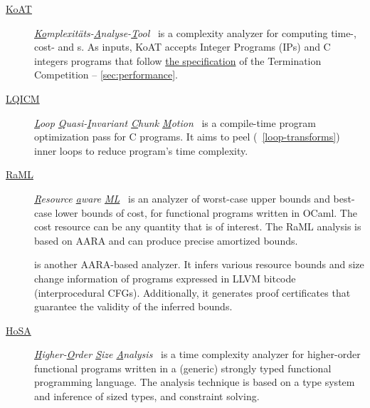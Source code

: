 \begin{description}
\item[\href{https://koat.verify.rwth-aachen.de/cfr_mprf}{KoAT}]
       \emph{\underline{Ko}mplexitäts-\underline{A}nalyse-\underline{T}ool}~\cite{brockschmidt2016}
       is a complexity analyzer for computing time-, cost- and s.
       As inputs, KoAT accepts Integer Programs (IPs) and C integers programs that follow
       \href{https://termination-portal.org/wiki/C_Integer_Programs}{the  specification} of the Termination Competition -- \autoref{sec:performance}.

\item[\href{https://github.com/statycc/LQICM_On_C_Toy_Parser}{LQICM}]
      \emph{\underline{L}oop \underline{Q}uasi-\underline{I}nvariant \underline{C}hunk \underline{M}otion}~\cite{moyen20172}
       is a compile-time program optimization pass for C programs.
       It aims to peel (\cf~\autoref{loop-transforms}) inner loops to reduce program's time complexity.

\item[\href{https://www.raml.co/about}{RaML}]
       \emph{\underline{R}esource \underline{a}ware \underline{ML}}~\cite{hoffmann2017}
       is an analyzer of worst-case upper bounds and best-case lower bounds of cost, for functional programs written in OCaml.
       The cost resource can be any quantity that is of interest.
       The RaML analysis is based on AARA and can produce precise amortized bounds.

\item[\href{https://github.com/academic-archive/cav17-pastis}{}]\cite{carbonneaux2017,carbonneaux2018}
      is another AARA-based analyzer. It infers various resource bounds and size
      change information of programs expressed in LLVM bitcode (interprocedural
      CFGs). Additionally, it generates proof certificates that guarantee the
      validity of the inferred bounds.

\item[\href{http://cl-informatik.uibk.ac.at/users/zini/software/hosa/}{HoSA}]
      \emph{\underline{H}igher-\underline{O}rder \underline{S}ize \underline{A}nalysis}~\cite{avanzini2017}
      is a time complexity analyzer for higher-order functional programs written in a (generic) strongly typed functional programming language.
      The analysis technique is based on a type system and inference of sized types, and constraint solving.


\end{description}
